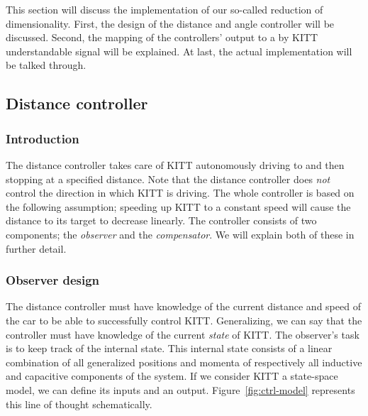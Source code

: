 \documentclass[11pt,titlepage]{report}
\begin{document}
This section will discuss the implementation of our so-called reduction of dimensionality. First, the design of the distance and angle controller will be discussed. Second, the mapping of the controllers' output to a by KITT understandable signal will be explained. At last, the actual implementation will be talked through.


\subsection{Distance controller}
\subsubsection{Introduction}
The distance controller takes care of KITT autonomously driving to and then stopping at a specified distance. Note that the distance controller does \textit{not} control the direction in which KITT is driving. The whole controller is based on the following assumption; speeding up KITT to a constant speed will cause the distance to its target to decrease linearly. The controller consists of two components; the \textit{observer} and the \textit{compensator}. We will explain both of these in further detail.

\subsubsection{Observer design}
The distance controller must have knowledge of the current distance and speed of the car to be able to successfully control KITT. Generalizing, we can say that the controller must have knowledge of the current \textit{state} of KITT. The observer's task is to keep track of the internal state. This internal state consists of a linear combination of all generalized positions and momenta of respectively all inductive and capacitive components of the system. If we consider KITT a state-space model, we can define its inputs and an output. Figure~\ref{fig:ctrl-model} represents this line of thought schematically.
\end{document}
